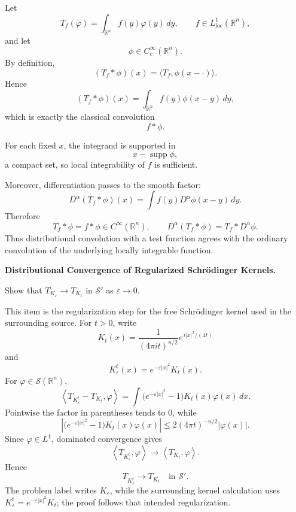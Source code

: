 \begin{solution}
Let
\[
T_f(\varphi)
=
\int_{\mathbb R^n}f(y)\varphi(y)\,dy,
\qquad
f\in L^1_{\mathrm{loc}}(\mathbb R^n),
\]
and let
\[
\phi\in C_c^\infty(\mathbb R^n).
\]
By definition,
\[
(T_f*\phi)(x)
=
\langle T_f,\phi(x-\cdot)\rangle.
\]
Hence
\[
\boxed{
(T_f*\phi)(x)
=
\int_{\mathbb R^n}
f(y)\phi(x-y)\,dy,
}
\]
which is exactly the classical convolution
\[
f*\phi.
\]

For each fixed \(x\), the integrand is supported in
\[
x-\operatorname{supp}\phi,
\]
a compact set, so local integrability of \(f\) is sufficient.

Moreover, differentiation passes to the smooth factor:
\[
D^\alpha(T_f*\phi)(x)
=
\int
f(y)D^\alpha\phi(x-y)\,dy.
\]
Therefore
\[
\boxed{
T_f*\phi=f*\phi\in C^\infty(\mathbb R^n),
\qquad
D^\alpha(T_f*\phi)=T_f*D^\alpha\phi.
}
\]
Thus distributional convolution with a test function agrees with the ordinary convolution of
the underlying locally integrable function.
\end{solution}


\begin{problem}[CP-II-0361]
\label{prob:cp-ii-0361}
\textbf{Distributional Convergence of Regularized Schrödinger Kernels.}

\hspace*{1.5em}Show that $T_{K_\varepsilon} \to T_{K_t}$ in $\mathscr{S}'$ as $\varepsilon\to0$.
\end{problem}

\begin{solution}
This item is the regularization step for the free Schrödinger kernel used in the surrounding
source. For \(t>0\), write
\[
K_t(x)
=
\frac{1}{(4\pi i t)^{n/2}}
e^{\,i|x|^2/(4t)}
\]
and
\[
K_\varepsilon^t(x)
=
e^{-\varepsilon|x|^2}K_t(x).
\]
For \(\varphi\in\mathcal S(\mathbb R^n)\),
\[
\left\langle T_{K_\varepsilon^t}-T_{K_t},\varphi\right\rangle
=
\int
\bigl(e^{-\varepsilon|x|^2}-1\bigr)K_t(x)\varphi(x)\,dx.
\]
Pointwise the factor in parentheses tends to \(0\), while
\[
\left|
\bigl(e^{-\varepsilon|x|^2}-1\bigr)K_t(x)\varphi(x)
\right|
\le
2(4\pi t)^{-n/2}|\varphi(x)|.
\]
Since \(\varphi\in L^1\), dominated convergence gives
\[
\left\langle T_{K_\varepsilon^t},\varphi\right\rangle
\to
\left\langle T_{K_t},\varphi\right\rangle.
\]
Hence
\[
\boxed{
T_{K_\varepsilon^t}\to T_{K_t}
\quad\text{in }\mathcal S'.
}
\]
The problem label writes \(K_\varepsilon\), while the surrounding kernel calculation uses
\(K_\varepsilon^t=e^{-\varepsilon|x|^2}K_t\); the proof follows that intended regularization.
\end{solution}


